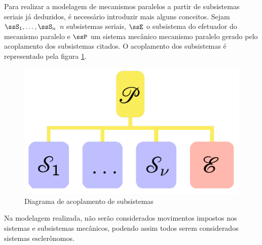 \documentclass[]{politex}
\begin{document}
Para realizar a modelagem de mecanismos paralelos a partir de subsistemas seriais j\'a deduzidos, \'e necess\'ario introduzir mais alguns conceitos. Sejam $\ssS_1, \hdots, \ssS_{n}$ $n$ subsistemas seriais, $\ssE$ o subsistema do efetuador do mecanismo paralelo e $\ssP$ um sistema mecânico mecanismo paralelo gerado pelo acoplamento dos subsistemas citados. O acoplamento dos subsistemas é representado pela figura \ref{fig:AcoplamentoMecParalelo}.
\begin{figure}[h]
	\centering
	\includegraphics[scale=0.42]{imagens/DiagramaAcoplamentoMecParalelos.png}  
	\caption{Diagrama de acoplamento de subsistemas}
	\label{fig:AcoplamentoMecParalelo}
\end{figure}

Na modelagem realizada, não serão considerados movimentos impostos nos sistemas e subsistemas mecânicos, podendo assim todos serem considerados sistemas esclerônomos.
\end{document}
